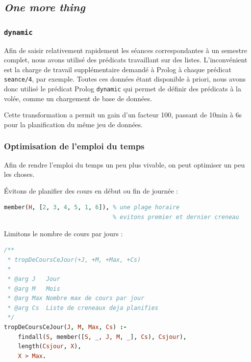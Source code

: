 
\subsection{\textit{One more thing}}

\subsubsection{\texttt{dynamic}}

Afin de saisir relativement rapidement les séances correspondantes à un semestre
complet, nous avons utilisé des prédicats travaillant sur des listes.
L'inconvénient est la charge de travail supplémentaire demandé à Prolog à chaque
prédicat \texttt{seance/4}, par exemple.
Toutes ces données étant disponible à priori, nous avons donc utilisé le
prédicat Prolog \texttt{dynamic} qui permet de définir des prédicats à la volée,
comme un chargement de base de données.

Cette transformation a permit un gain d'un facteur 100, passant de 10min à 6s
pour la planification du même jeu de données.

\subsubsection{Optimisation de l'emploi du temps}

Afin de rendre l'emploi du temps un peu plus vivable, on peut optimiser un peu
les choses.

Évitons de planifier des cours en début ou fin de journée :

\begin{lstlisting}[language=Prolog, caption=Éviter début et fin de journée,
captionpos=b, label={lst:debutfin}]
% plage(H, _, _).
member(H, [2, 3, 4, 5, 1, 6]), % une plage horaire
                               % evitons premier et dernier creneau
\end{lstlisting}

Limitons le nombre de cours par jours :

\begin{lstlisting}[language=Prolog, caption=Limite de cours par jour,
captionpos=b, label={lst:nbcours}]
/**
 * tropDeCoursCeJour(+J, +M, +Max, +Cs)
 *
 * @arg J   Jour
 * @arg M   Mois
 * @arg Max Nombre max de cours par jour
 * @arg Cs  Liste de creneaux deja planifies
 */
tropDeCoursCeJour(J, M, Max, Cs) :-
    findall(S, member([S, _, J, M, _], Cs), Csjour),
    length(Csjour, X),
    X > Max.
\end{lstlisting}

